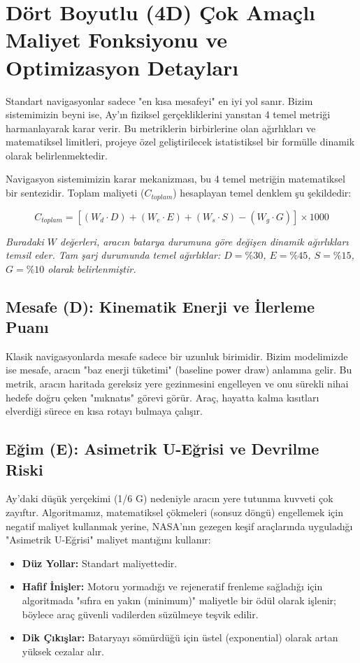 \documentclass[12pt,a4paper]{article}
\begin{document}
\section{Dört Boyutlu (4D) Çok Amaçlı Maliyet Fonksiyonu ve Optimizasyon Detayları}
Standart navigasyonlar sadece "en kısa mesafeyi" en iyi yol sanır. Bizim sistemimizin beyni ise, Ay’ın fiziksel gerçekliklerini yansıtan 4 temel metriği harmanlayarak karar verir. Bu metriklerin birbirlerine olan ağırlıkları ve matematiksel limitleri, projeye özel geliştirilecek istatistiksel bir formülle dinamik olarak belirlenmektedir.

Navigasyon sistemimizin karar mekanizması, bu 4 temel metriğin matematiksel bir sentezidir. Toplam maliyeti ($C_{toplam}$) hesaplayan temel denklem şu şekildedir:

\begin{equation}
C_{toplam} = \left[ (W_d \cdot D) + (W_e \cdot E) + (W_s \cdot S) - (W_g \cdot G) \right] \times 1000
\end{equation}

\textit{Buradaki $W$ değerleri, aracın batarya durumuna göre değişen dinamik ağırlıkları temsil eder. Tam şarj durumunda temel ağırlıklar: $D = \%30$, $E = \%45$, $S = \%15$, $G = \%10$ olarak belirlenmiştir.}

\subsection{Mesafe (D): Kinematik Enerji ve İlerleme Puanı}
Klasik navigasyonlarda mesafe sadece bir uzunluk birimidir. Bizim modelimizde ise mesafe, aracın "baz enerji tüketimi" (baseline power draw) anlamına gelir. Bu metrik, aracın haritada gereksiz yere gezinmesini engelleyen ve onu sürekli nihai hedefe doğru çeken "mıknatıs" görevi görür. Araç, hayatta kalma kısıtları elverdiği sürece en kısa rotayı bulmaya çalışır.

\subsection{Eğim (E): Asimetrik U-Eğrisi ve Devrilme Riski}
Ay’daki düşük yerçekimi (1/6 G) nedeniyle aracın yere tutunma kuvveti çok zayıftır. Algoritmamız, matematiksel çökmeleri (sonsuz döngü) engellemek için negatif maliyet kullanmak yerine, NASA’nın gezegen keşif araçlarında uyguladığı "Asimetrik U-Eğrisi" maliyet mantığını kullanır:
\begin{itemize}
    \item \textbf{Düz Yollar:} Standart maliyettedir.
    \item \textbf{Hafif İnişler:} Motoru yormadığı ve rejeneratif frenleme sağladığı için algoritmada "sıfıra en yakın (minimum)" maliyetle bir ödül olarak işlenir; böylece araç güvenli vadilerden süzülmeye teşvik edilir.
    \item \textbf{Dik Çıkışlar:} Bataryayı sömürdüğü için üstel (exponential) olarak artan yüksek cezalar alır.
\end{itemize}
\end{document}
